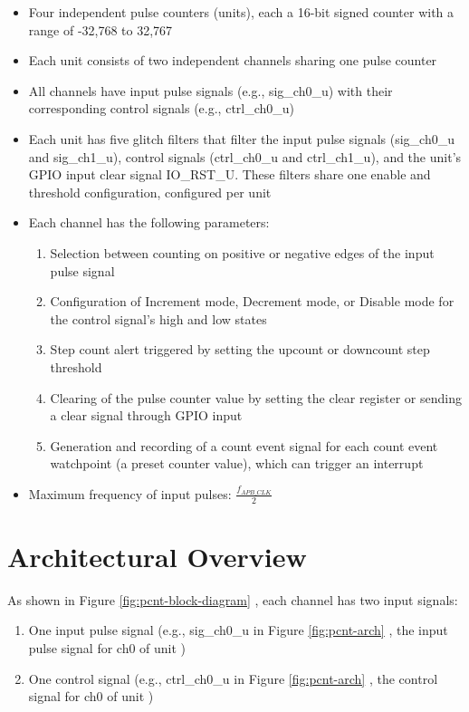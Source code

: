 \documentclass[main\_\_EN.tex]{subfiles}
\begin{document}
\begin{itemize}
    \item Four independent pulse counters (units), each a 16-bit signed counter with a range of -32,768 to 32,767
    \item Each unit consists of two independent channels sharing one pulse counter
    \item All channels have input pulse signals (e.g., sig\_ch0\_u) with their corresponding control signals (e.g., ctrl\_ch0\_u)
    \item Each unit has five glitch filters that filter the input pulse signals (sig\_ch0\_u and sig\_ch1\_u), control signals (ctrl\_ch0\_u and ctrl\_ch1\_u), and the unit's GPIO input clear signal IO\_RST\_U. These filters share one enable and threshold configuration, configured per unit
    \item Each channel has the following parameters:
        \begin{enumerate}
            \item Selection between counting on positive or negative edges of the input pulse signal
            \item Configuration of Increment mode, Decrement mode, or Disable mode for the control signal's high and low states
            \item Step count alert triggered by setting the upcount or downcount step threshold
            \item Clearing of the pulse counter value by setting the clear register or sending a clear signal through GPIO input
            \item Generation and recording of a count event signal for each count event watchpoint (a preset counter value), which can trigger an interrupt
        \end{enumerate}
    \item Maximum frequency of input pulses: $\frac{f_{APB\_CLK}}{2}$
\end{itemize}

\section{Architectural Overview}
\label{sec:pcnt-arch-overview}

As shown in Figure \ref{fig:pcnt-block-diagram} \textit{}, each channel has two input signals:
\begin{enumerate}
    \item One input pulse signal (e.g., sig\_ch0\_u in Figure \ref{fig:pcnt-arch} \textit{}, the input pulse signal for ch0 of unit )
    \item One control signal (e.g., ctrl\_ch0\_u in Figure \ref{fig:pcnt-arch} \textit{}, the control signal for ch0 of unit )
\end{enumerate}
\end{document}
